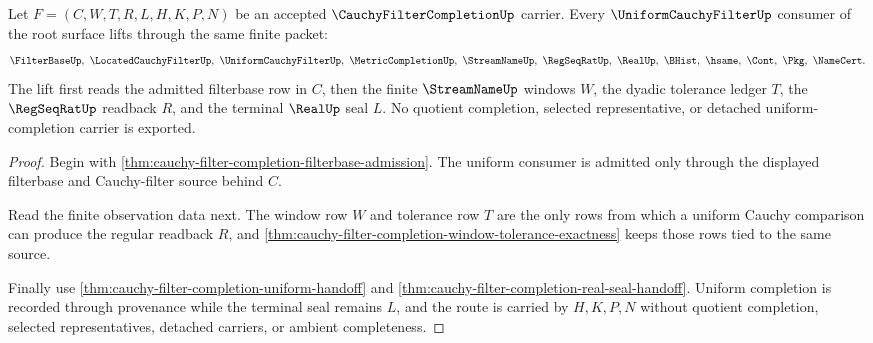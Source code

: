 \begin{theorem}
\label{thm:cauchy-filter-completion-uniform-cauchy-lift}
Let $F=(C,W,T,R,L,H,K,P,N)$ be an accepted $\CauchyFilterCompletionUp$ carrier. Every $\UniformCauchyFilterUp$ consumer of the root surface lifts through the same finite packet:
$$
\FilterBaseUp,\ \LocatedCauchyFilterUp,\ \UniformCauchyFilterUp,\ \MetricCompletionUp,\ \StreamNameUp,\ \RegSeqRatUp,\ \RealUp,\ \BHist,\ \hsame,\ \Cont,\ \Pkg,\ \NameCert .
$$
The lift first reads the admitted filterbase row in $C$, then the finite $\StreamNameUp$ windows $W$, the dyadic tolerance ledger $T$, the $\RegSeqRatUp$ readback $R$, and the terminal $\RealUp$ seal $L$. No quotient completion, selected representative, or detached uniform-completion carrier is exported.
\end{theorem}
\begin{proof}
Begin with \autoref{thm:cauchy-filter-completion-filterbase-admission}. The uniform consumer is admitted only through the displayed filterbase and Cauchy-filter source behind $C$.

Read the finite observation data next. The window row $W$ and tolerance row $T$ are the only rows from which a uniform Cauchy comparison can produce the regular readback $R$, and \autoref{thm:cauchy-filter-completion-window-tolerance-exactness} keeps those rows tied to the same source.

Finally use \autoref{thm:cauchy-filter-completion-uniform-handoff} and \autoref{thm:cauchy-filter-completion-real-seal-handoff}. Uniform completion is recorded through provenance while the terminal seal remains $L$, and the route is carried by $H,K,P,N$ without quotient completion, selected representatives, detached carriers, or ambient completeness.
\end{proof}

